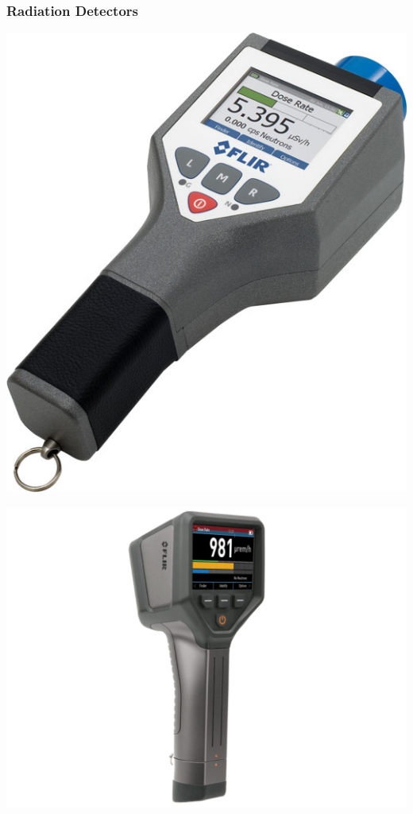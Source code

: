 \documentclass[aspectratio=169]{beamer}
\begin{document}
\begin{frame}
    \frametitle{Radiation Detectors}
    \begin{minipage}{0.32\textwidth}
        \centering
        \includegraphics[width=\textwidth]{images/identifinder-r400.jpg}
    \end{minipage}
    \begin{minipage}{0.32\textwidth}
        \centering
        \includegraphics[width=\textwidth]{images/3ec8b23336eae1f156ba18f4e28166bd.1624378760.png}

\end{minipage}
\end{frame}
\end{document}
